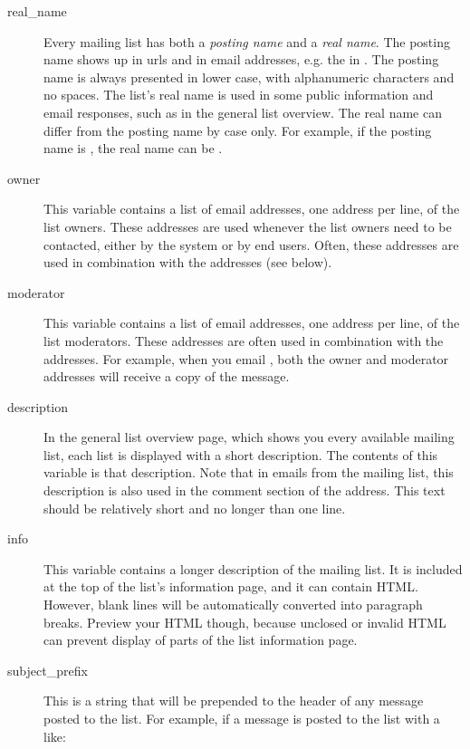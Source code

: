 \documentclass{howto}
\begin{document}
\begin{description}
\item[real_name]
    Every mailing list has both a \emph{posting name} and a \emph{real
    name}.  The posting name shows up in urls and in email addresses,
    e.g. the  in .  The posting
    name is always presented in lower case, with alphanumeric
    characters and no spaces.  The list's real name is used in some
    public information and email responses, such as in the general
    list overview.  The real name can differ from the posting name by
    case only.  For example, if the posting name is , the
    real name can be .

\item[owner]
    This variable contains a list of email addresses, one address per
    line, of the list owners.  These addresses are used whenever the
    list owners need to be contacted, either by the system or by end
    users.  Often, these addresses are used in combination with the
     addresses (see below).

\item[moderator]
    This variable contains a list of email addresses, one address per
    line, of the list moderators.  These addresses are often used in
    combination with the  addresses.  For example, when
    you email , both the owner and
    moderator addresses will receive a copy of the message.

\item[description]
    In the general list overview page, which shows you every available
    mailing list, each list is displayed with a short description.
    The contents of this variable is that description.  Note that in
    emails from the mailing list, this description is also used in the
    comment section of the  address.  This text should
    be relatively short and no longer than one line.

\item[info]
    This variable contains a longer description of the mailing list.
    It is included at the top of the list's information page, and it
    can contain HTML.  However, blank lines will be automatically
    converted into paragraph breaks.  Preview your HTML though,
    because unclosed or invalid HTML can prevent display of parts of
    the list information page.

\item[subject_prefix]
    This is a string that will be prepended to the
     header of any message posted to the list.
    For example, if a message is posted to the list with a
     like:


\end{description}
\end{document}
